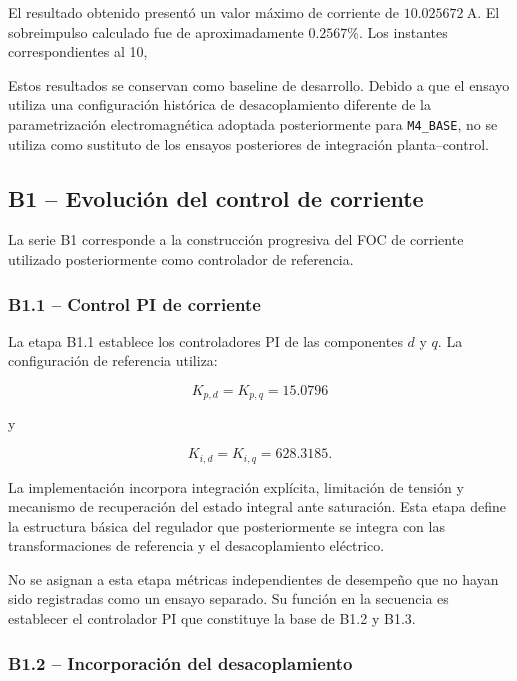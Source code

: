 El resultado obtenido presentó un valor máximo de corriente de \(10.025672~\mathrm{A}\). El sobreimpulso calculado fue de aproximadamente \(0.2567\%\). Los instantes correspondientes al 10,%

Estos resultados se conservan como baseline de desarrollo. Debido a que el ensayo utiliza una configuración histórica de desacoplamiento diferente de la parametrización electromagnética adoptada posteriormente para \texttt{M4\_BASE}, no se utiliza como sustituto de los ensayos posteriores de integración planta--control.

\subsection{B1 -- Evolución del control de corriente}

La serie B1 corresponde a la construcción progresiva del FOC de corriente utilizado posteriormente como controlador de referencia.

\subsubsection{B1.1 -- Control PI de corriente}

La etapa B1.1 establece los controladores PI de las componentes \(d\) y \(q\). La configuración de referencia utiliza:

\begin{equation}
K_{p,d}=K_{p,q}=15.0796
\end{equation}

y

\begin{equation}
K_{i,d}=K_{i,q}=628.3185.
\end{equation}

La implementación incorpora integración explícita, limitación de tensión y mecanismo de recuperación del estado integral ante saturación. Esta etapa define la estructura básica del regulador que posteriormente se integra con las transformaciones de referencia y el desacoplamiento eléctrico.

No se asignan a esta etapa métricas independientes de desempeño que no hayan sido registradas como un ensayo separado. Su función en la secuencia es establecer el controlador PI que constituye la base de B1.2 y B1.3.

\subsubsection{B1.2 -- Incorporación del desacoplamiento}

